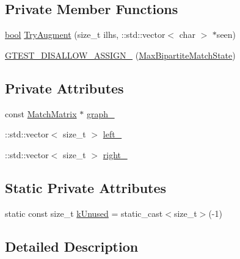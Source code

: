 \subsection*{Private Member Functions}
\begin{DoxyCompactItemize}
\item 
\hyperlink{classbool}{bool} \hyperlink{classtesting_1_1internal_1_1MaxBipartiteMatchState_a8aa8dc82be659772a1dd68eb00d7a858}{Try\+Augment} (size\+\_\+t ilhs, \+::std\+::vector$<$ char $>$ $\ast$seen)
\item 
\hyperlink{classtesting_1_1internal_1_1MaxBipartiteMatchState_a633fb7cfb6634dbbb1b62637efc540f8}{G\+T\+E\+S\+T\+\_\+\+D\+I\+S\+A\+L\+L\+O\+W\+\_\+\+A\+S\+S\+I\+G\+N\+\_\+} (\hyperlink{classtesting_1_1internal_1_1MaxBipartiteMatchState}{Max\+Bipartite\+Match\+State})
\end{DoxyCompactItemize}
\subsection*{Private Attributes}
\begin{DoxyCompactItemize}
\item 
const \hyperlink{classtesting_1_1internal_1_1MatchMatrix}{Match\+Matrix} $\ast$ \hyperlink{classtesting_1_1internal_1_1MaxBipartiteMatchState_aba20adc38680caf7db98321cfde24dec}{graph\+\_\+}
\item 
\+::std\+::vector$<$ size\+\_\+t $>$ \hyperlink{classtesting_1_1internal_1_1MaxBipartiteMatchState_af63f4d7546e914a13b43f30e63f27b6f}{left\+\_\+}
\item 
\+::std\+::vector$<$ size\+\_\+t $>$ \hyperlink{classtesting_1_1internal_1_1MaxBipartiteMatchState_a85c29e270fd44f16458cf48cdc06d19a}{right\+\_\+}
\end{DoxyCompactItemize}
\subsection*{Static Private Attributes}
\begin{DoxyCompactItemize}
\item 
static const size\+\_\+t \hyperlink{classtesting_1_1internal_1_1MaxBipartiteMatchState_a628d16d346432c1556097b94fad27e42}{k\+Unused} = static\+\_\+cast$<$size\+\_\+t$>$(-\/1)
\end{DoxyCompactItemize}


\subsection{Detailed Description}



